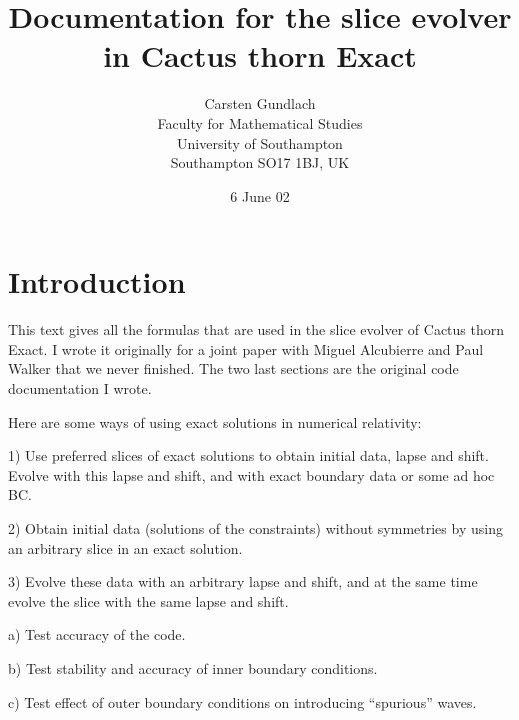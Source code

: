 



\title{Documentation for the slice evolver in Cactus thorn Exact}

\author{Carsten Gundlach\\ Faculty for Mathematical Studies\\
University of Southampton\\ Southampton SO17 1BJ, UK}

\date{6 June 02}

\maketitle


\section{Introduction}


This text gives all the formulas that are used in the slice evolver of
Cactus thorn Exact. I wrote it originally for a joint paper with
Miguel Alcubierre and Paul Walker that we never finished. The two last
sections are the original code documentation I wrote.

Here are some ways of using exact solutions in numerical relativity:

1) Use preferred slices of exact solutions to obtain initial data,
lapse and shift. Evolve with this lapse and shift, and with exact
boundary data or some ad hoc BC.

2) Obtain initial data (solutions of the constraints) without
symmetries by using an arbitrary slice in an exact solution. 

3) Evolve these data with an arbitrary lapse and shift, and at the
same time evolve the slice with the same lapse and shift.

a) Test accuracy of the code.

b) Test stability and accuracy of inner boundary conditions.

c) Test effect of outer boundary conditions on introducing
``spurious'' waves.

